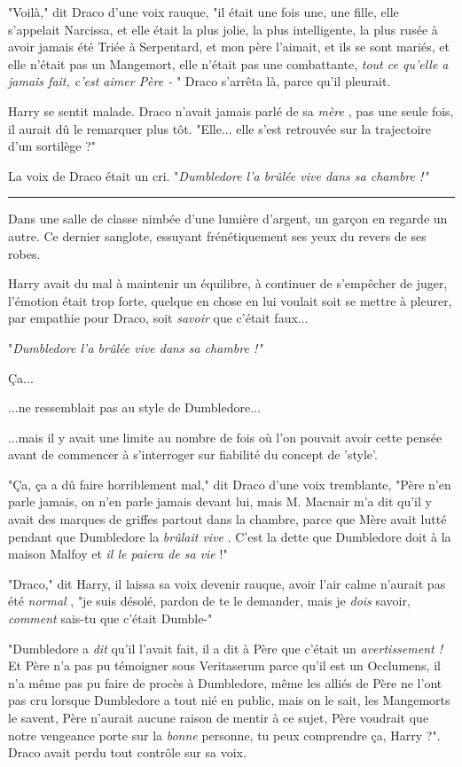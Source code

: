 "Voilà," dit Draco d'une voix rauque, "il était une fois une, une fille, elle s'appelait Narcissa, et elle était la plus jolie, la plus intelligente, la plus rusée à avoir jamais été Triée à Serpentard, et mon père l'aimait, et ils se sont mariés, et elle n'était pas un Mangemort, elle n'était pas une combattante, \emph{tout ce qu'elle a jamais fait, c'est aimer Père -} " Draco s'arrêta là, parce qu'il pleurait.

Harry se sentit malade. Draco n'avait jamais parlé de sa \emph{mère} , pas une seule fois, il aurait dû le remarquer plus tôt. "Elle... elle s'est retrouvée sur la trajectoire d'un sortilège ?"

La voix de Draco était un cri. "\emph{Dumbledore l'a brûlée vive dans sa chambre !"} 
\par\noindent\rule{\textwidth}{0.4pt}
Dans une salle de classe nimbée d'une lumière d'argent, un garçon en regarde un autre. Ce dernier sanglote, essuyant frénétiquement ses yeux du revers de ses robes.

Harry avait du mal à maintenir un équilibre, à continuer de s'empêcher de juger, l'émotion était trop forte, quelque en chose en lui voulait soit se mettre à pleurer, par empathie pour Draco, soit \emph{savoir}  que c'était faux...

"\emph{Dumbledore l'a brûlée vive dans sa chambre !"} 

Ça...

...ne ressemblait pas au style de Dumbledore...

...mais il y avait une limite au nombre de fois où l'on pouvait avoir cette pensée avant de commencer à s'interroger sur fiabilité du concept de 'style'.

"Ça, ça a dû faire horriblement mal," dit Draco d'une voix tremblante, "Père n'en parle jamais, on n'en parle jamais devant lui, mais M. Macnair m'a dit qu'il y avait des marques de griffes partout dans la chambre, parce que Mère avait lutté pendant que Dumbledore la \emph{brûlait vive} . C'est la dette que Dumbledore doit à la maison Malfoy et \emph{il le paiera de sa vie}  !"

"Draco," dit Harry, il laissa sa voix devenir rauque, avoir l'air calme n'aurait pas été \emph{normal} , "je suis désolé, pardon de te le demander, mais je \emph{dois}  savoir, \emph{comment}  sais-tu que c'était Dumble-"

"Dumbledore a \emph{dit}  qu'il l'avait fait, il a dit à Père que c'était un \emph{avertissement !}  Et Père n'a pas pu témoigner sous Veritaserum parce qu'il est un Occlumens, il n'a même pas pu faire de procès à Dumbledore, même les alliés de Père ne l'ont pas cru lorsque Dumbledore a tout nié en public, mais on le sait, les Mangemorts le savent, Père n'aurait aucune raison de mentir à ce sujet, Père voudrait que notre vengeance porte sur la \emph{bonne}  personne, tu peux comprendre ça, Harry ?". Draco avait perdu tout contrôle sur sa voix.


